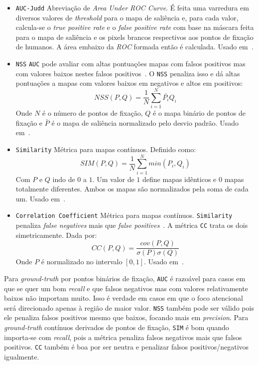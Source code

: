 \documentclass[11pt]{article}
\newcommand{\tit}[1]{\textit{#1}}
\newcommand{\ttt}[1]{\texttt{#1}}
\begin{document}
\begin{itemize}
	\item \ttt{AUC-Judd}\newline
	Abreviação de \tit{Area Under ROC Curve}. É feita uma varredura em diversos
	valores de \tit{threshold} para o mapa de saliência e, para cada valor,
	calcula-se o \tit{true positive rate} e o \tit{false positive rate} com
	base na máscara feita para o mapa de saliência e os pixels brancos
	respectivos aos pontos de fixação de humanos.
	A área embaixo da \tit{ROC} formada então é calculada.
	Usado em~\cite{mit-300, juddBM}.

	\item \ttt{NSS}\newline
	\ttt{AUC} pode avaliar com altas pontuações mapas com falsos positivos
	mas com valores baixos nestes falsos positivos~\cite{judd2}.
	O \ttt{NSS} penaliza isso e dá altas pontuações a mapas com valores
	baixos em negativos e altos em positivos:
	$$NSS(P, Q) = \frac{1}{N}\sum\limits_{i=1}^N{\bar{P_{i}}Q_{i}}$$
	Onde $N$ é o número de pontos de fixação,
	$Q$ é o mapa binário de pontos de fixação e $\bar{P}$ é o mapa de
	saliência normalizado pelo desvio padrão.
	Usado em~\cite{mit-300}.

	\item \ttt{Similarity}\newline
	Métrica para mapas contínuos. Definido como:
	$$SIM(P, Q) = \frac{1}{N}\sum\limits_{i=1}^N{min(P_i, Q_i)}$$
	Com $P$ e $Q$ indo de $0$ a $1$. Um valor de $1$ define mapas idênticos
	e $0$ mapas totalmente diferentes.
	Ambos os mapas são normalizados pela soma de cada um.
	Usado em~\cite{mit-300}.

	\item \ttt{Correlation Coefficient}\newline
	Métrica para mapas contínuos.
	\ttt{Similarity} penaliza \tit{false negatives} mais que
	\tit{false positives}~\cite{judd2}. A métrica \ttt{CC} trata os dois
	simetricamente. Dada por:
	$$CC(P, Q) = \frac{cov(P,Q)}{\sigma(P)\sigma(Q)}$$
	Onde $P$ é normalizado no intervalo $[0, 1]$.
	Usado em~\cite{mit-300}.
\end{itemize}

Para \tit{ground-truth} por pontos binários de fixação,
\ttt{AUC} é razoável para casos em que se quer um
bom \tit{recall} e que falsos negativos mas com valores relativamente baixos
não importam muito. Isso é verdade em casos em que o foco atencional será
direcionado apenas à região de maior valor.
\ttt{NSS} também pode ser válido pois ele penaliza falsos positivos mesmo
que baixos, focando mais em \tit{precision}.
Para \tit{ground-truth} contínuos derivados de pontos de fixação,
\ttt{SIM} é bom quando importa-se com \tit{recall}, pois a métrica penaliza
falsos negativos mais que falsos positivos.
\ttt{CC} também é boa por ser neutra e penalizar falsos positivos/negativos
igualmente.
\end{document}

